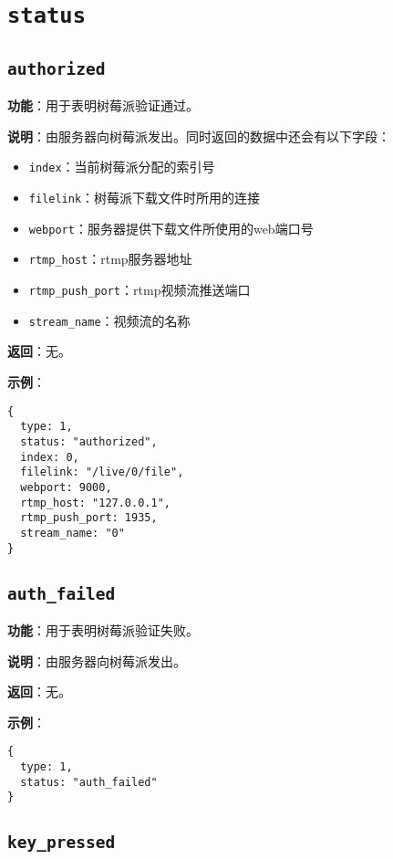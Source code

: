 \documentclass{article}
\begin{document}
\section{\texttt{status}}

\subsection{\texttt{authorized}}
\label{status:authorized}

\noindent\textbf{功能}：用于表明树莓派验证通过。

\noindent\textbf{说明}：由服务器向树莓派发出。同时返回的数据中还会有以下字段：
\begin{itemize}
\item \texttt{index}：当前树莓派分配的索引号
\item \texttt{filelink}：树莓派下载文件时所用的连接
\item \texttt{webport}：服务器提供下载文件所使用的web端口号 
\item \texttt{rtmp\_host}：rtmp服务器地址
\item \texttt{rtmp\_push\_port}：rtmp视频流推送端口
\item \texttt{stream\_name}：视频流的名称
\end{itemize}

\noindent\textbf{返回}：无。

\noindent\textbf{示例}：

\begin{lstlisting}[style=json]
{
  type: 1,
  status: "authorized",
  index: 0,
  filelink: "/live/0/file",
  webport: 9000,
  rtmp_host: "127.0.0.1",
  rtmp_push_port: 1935,
  stream_name: "0"
}
\end{lstlisting}

\subsection{\texttt{auth\_failed}}
\label{status:auth_failed}

\noindent\textbf{功能}：用于表明树莓派验证失败。

\noindent\textbf{说明}：由服务器向树莓派发出。

\noindent\textbf{返回}：无。

\noindent\textbf{示例}：

\begin{lstlisting}[style=json]
{
  type: 1,
  status: "auth_failed"
}
\end{lstlisting}

\subsection{\texttt{key\_pressed}}
\label{status:key_pressed}
\end{document}
